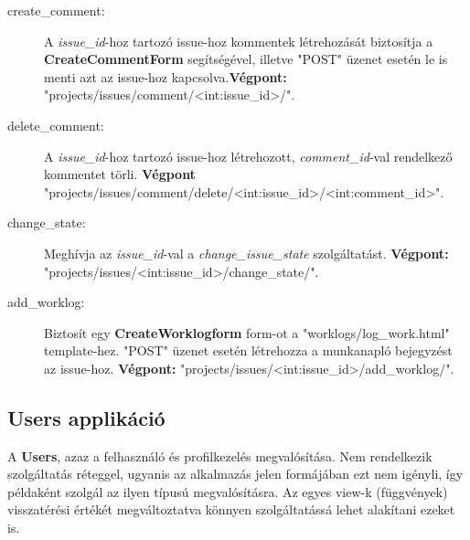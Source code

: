 \begin{itemize}
\begin{description}
		\item[create\_comment:] A \textit{issue\_id}-hoz tartozó issue-hoz kommentek létrehozását biztosítja a \textbf{CreateCommentForm} segítségével, illetve "POST" üzenet esetén le is menti azt az issue-hoz kapcsolva.\textbf{Végpont:} "projects/issues/comment/<int:issue\_id>/".
		\item[delete\_comment:] A \textit{issue\_id}-hoz tartozó issue-hoz létrehozott, \textit{comment\_id}-val rendelkező kommentet törli. \textbf{Végpont} "projects/issues/comment/delete/<int:issue\_id>/<int:comment\_id>".
		\item[change\_state:] Meghívja az \textit{issue\_id}-val a \textit{change\_issue\_state} szolgáltatást. \textbf{Végpont:} "projects/issues/<int:issue\_id>/change\_state/".
		\item[add\_worklog:] Biztosít egy \textbf{CreateWorklogform} form-ot a "worklogs/log\_work.html" template-hez. "POST" üzenet esetén létrehozza a munkanapló bejegyzést az issue-hoz. \textbf{Végpont:} "projects/issues/<int:issue\_id>/add\_worklog/".
	\end{description}
\end{itemize}	

\subsection{Users applikáció}

A \textbf{Users}, azaz a felhasználó és profilkezelés megvalósítása. Nem rendelkezik szolgáltatás réteggel, ugyanis az alkalmazás jelen formájában ezt nem igényli, így példaként szolgál az ilyen típusú megvalósításra. Az egyes view-k (függvények) visszatérési értékét megváltoztatva könnyen szolgáltatássá lehet alakítani ezeket is.

